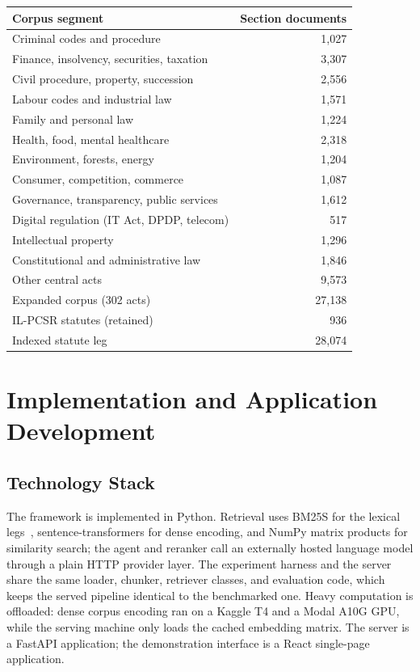 \documentclass{mnnit}
\makeatletter
\newcommand{\tabcaption}[1]{\def\@captype{table}\caption{#1}}
\makeatother
\begin{document}
\begin{center}
\tabcaption{Composition of the expanded statute index. The
precedent leg retains its 3,183 IL-PCSR documents.}
\label{tab:corpus}
\vspace{2mm}
\begin{tabular}{lr}
\toprule
Corpus segment & Section documents \\
\midrule
Criminal codes and procedure & 1,027 \\
Finance, insolvency, securities, taxation & 3,307 \\
Civil procedure, property, succession & 2,556 \\
Labour codes and industrial law & 1,571 \\
Family and personal law & 1,224 \\
Health, food, mental healthcare & 2,318 \\
Environment, forests, energy & 1,204 \\
Consumer, competition, commerce & 1,087 \\
Governance, transparency, public services & 1,612 \\
Digital regulation (IT Act, DPDP, telecom) & 517 \\
Intellectual property & 1,296 \\
Constitutional and administrative law & 1,846 \\
Other central acts & 9,573 \\
\midrule
Expanded corpus (302 acts) & 27,138 \\
IL-PCSR statutes (retained) & 936 \\
\midrule
Indexed statute leg & 28,074 \\
\bottomrule
\end{tabular}
\end{center}

\chapter{Implementation and Application Development}

\section{Technology Stack}
The framework is implemented in Python. Retrieval uses BM25S for
the lexical legs~\cite{bm25s}, sentence-transformers for dense
encoding, and NumPy matrix products for similarity search; the
agent and reranker call an externally hosted language model
through a plain HTTP provider layer. The experiment harness and
the server share the same loader, chunker, retriever classes, and
evaluation code, which keeps the served pipeline identical to the
benchmarked one. Heavy computation is offloaded: dense corpus
encoding ran on a Kaggle T4 and a Modal A10G GPU, while the
serving machine only loads the cached embedding matrix. The
server is a FastAPI application; the demonstration interface is a
React single-page application.
\end{document}
